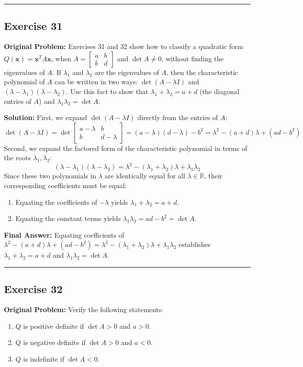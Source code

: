 \documentclass[11pt, letterpaper]{article}
\theoremstyle{definition}
\theoremstyle{remark}
\begin{document}
\medskip\hrule\medskip

\subsection*{Exercise 31}
\textbf{Original Problem:} Exercises 31 and 32 show how to classify a quadratic form $Q(\mathbf{x}) = \mathbf{x}^T A \mathbf{x}$, when $A = \begin{bmatrix} a & b \\ b & d \end{bmatrix}$ and $\det A \neq 0$, without finding the eigenvalues of $A$. If $\lambda_1$ and $\lambda_2$ are the eigenvalues of $A$, then the characteristic polynomial of $A$ can be written in two ways: $\det(A - \lambda I)$ and $(\lambda - \lambda_1)(\lambda - \lambda_2)$. Use this fact to show that $\lambda_1 + \lambda_2 = a + d$ (the diagonal entries of $A$) and $\lambda_1 \lambda_2 = \det A$.

\textbf{Solution:}
First, we expand $\det(A - \lambda I)$ directly from the entries of $A$:
\[
\det(A - \lambda I) = \det \begin{bmatrix} a - \lambda & b \\ b & d - \lambda \end{bmatrix} = (a - \lambda)(d - \lambda) - b^2 = \lambda^2 - (a + d)\lambda + (ad - b^2)
\]
Second, we expand the factored form of the characteristic polynomial in terms of the roots $\lambda_1, \lambda_2$:
\[
(\lambda - \lambda_1)(\lambda - \lambda_2) = \lambda^2 - (\lambda_1 + \lambda_2)\lambda + \lambda_1 \lambda_2
\]
Since these two polynomials in $\lambda$ are identically equal for all $\lambda \in \mathbb{R}$, their corresponding coefficients must be equal:
\begin{enumerate}
    \item Equating the coefficients of $-\lambda$ yields $\lambda_1 + \lambda_2 = a + d$.
    \item Equating the constant terms yields $\lambda_1 \lambda_2 = ad - b^2 = \det A$.
\end{enumerate}
\textbf{Final Answer:} Equating coefficients of $\lambda^2 - (a+d)\lambda + (ad-b^2) = \lambda^2 - (\lambda_1+\lambda_2)\lambda + \lambda_1\lambda_2$ establishes $\lambda_1 + \lambda_2 = a + d$ and $\lambda_1\lambda_2 = \det A$.

\medskip\hrule\medskip

\subsection*{Exercise 32}
\textbf{Original Problem:} Verify the following statements:
\begin{enumerate}[label=\alph*.]
    \item $Q$ is positive definite if $\det A > 0$ and $a > 0$.
    \item $Q$ is negative definite if $\det A > 0$ and $a < 0$.
    \item $Q$ is indefinite if $\det A < 0$.
\end{enumerate}
\end{document}
